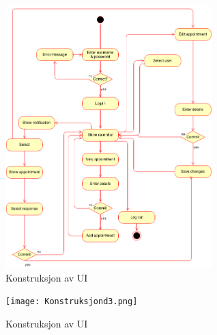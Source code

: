\documentclass{article}
\begin{document}
\begin{figure}[h!] 
    \begin{center}  
    	\includegraphics[width=8cm]{calendarStateDiagram.png}
		\caption{Konstruksjon av UI}
	\label{uikonstruksjon}
	\end{center}
\end{figure}


\begin{figure}[h!] 
    \begin{center}  
    	\texttt{[image: Konstruksjond3.png]}
		\caption{Konstruksjon av UI}
	\label{konstruksjond3}
	\end{center}
\end{figure}
\end{document}
